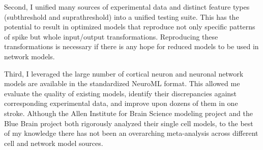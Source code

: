 Second, I unified many sources of experimental data and distinct feature types (subthreshold and suprathreshold) into a unified testing suite.
This has the potential to result in optimized models that reproduce not only specific patterns of spike but whole input/output transformations.
Reproducing these transformations is necessary if there is any hope for reduced models to be used in network models.

Third, I leveraged the large number of cortical neuron and neuronal network models are available in the standardized NeuroML format.
This allowed me evaluate the quality of existing models, identify their discrepancies against corresponding experimental data, and improve upon dozens of them in one stroke.
Although the Allen Institute for Brain Science modeling project and the Blue Brain project both rigorously analyzed their single cell models, to the best of my knowledge there has not been an overarching meta-analysis across different cell and network model sources.





